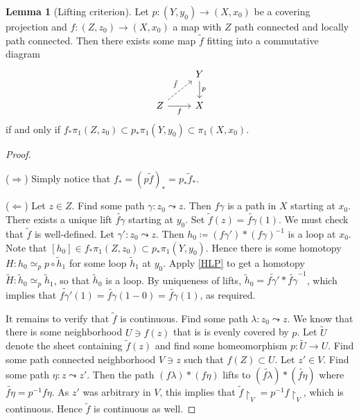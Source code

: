 \documentclass[10pt,letterpaper,cm]{nupset}
\theoremstyle{definition}
\theoremstyle{theorem}
\newtheorem{lemma}[definition]{Lemma}
\theoremstyle{remark}
\newcommand{\1}{\mathbb{1}}
\newcommand{\0}{\vec 0}
\begin{document}
\begin{lemma}[Lifting criterion]\label{LC}
Let $p: \left(Y, y_0\right) \to \left(X, x_0\right)$ be a covering projection and $f: (Z, z_0) \to \left(X, x_0\right)$ a map with $Z$ path connected and locally path connected.  Then there exists some map $\tilde{f}$ fitting into a commutative diagram \[
\begin{tikzcd}
 & Y \arrow[d, "p"] \\
Z \arrow[r, "f"'] \arrow[ru, "\tilde{f}", dashed] & X
\end{tikzcd}
\] if and only if  $f_{\ast}\pi_1(Z, z_0) \subset p_{\ast} \pi_1\left(Y, y_0\right) \subset \pi_1\left(X, x_0\right)$. 
\end{lemma}
\begin{proof} $ $

\smallskip

($\Longrightarrow$) Simply notice that $f_{\ast} = \left(p\tilde{f}\right)_{\ast}= p_{\ast}\tilde{f}_{\ast}$.

\medskip

 
($\Longleftarrow$) Let $z\in Z$. Find some path $\gamma : z_0 \leadsto z$.  Then $f \gamma$ is a path in $X$ starting at $x_0$. There exists a unique lift $\widetilde{f \gamma}$ starting at $y_0$. Set $\tilde{f}(z) = \widetilde{f \gamma}(1)$. We must check that $\tilde{f}$ is well-defined. Let $\gamma' : z_0 \leadsto z$. Then $h_0\coloneqq (f \gamma ')\ast (f\gamma)^{-1}$ is a loop at $x_0$. Note that $\left[h_0\right] \in f_{\ast}\pi_1(Z, z_0) \subset p_{\ast} \pi_1\left(Y, y_0\right)$. Hence there is some homotopy $H: h_0 \simeq_p p \circ \tilde{h}_1$ for some loop $\tilde{h}_1$ at $y_0$. Apply \cref{HLP} to get a homotopy $\widetilde{H} : \tilde{h}_0 \simeq_p \tilde{h}_1$, so that $\tilde{h}_0$ is a loop. By uniqueness of lifts, $\tilde{h}_0 =\widetilde{f \gamma '}\ast \widetilde{f\gamma}^{-1}$, which implies that $\widetilde{f \gamma '}(1) = \widetilde{f\gamma}(1-0) = \widetilde{f\gamma}(1)$, as required.

\medskip

 It remains to verify that $\tilde{f}$ is continuous. Find some path $\lambda : z_0 \leadsto z$. We know that there is some neighborhood $U \ni f(z)$ that is is evenly covered by $p$. Let $\widetilde{U}$ denote the sheet containing $\tilde{f}(z)$ and find some homeomorphism $p : \widetilde{U} \to U $. Find some path connected neighborhood $V\ni z$ such that $f(Z) \subset U$. Let $z' \in V$. Find some path $\eta : z \leadsto z'$. Then the path $\left(f \lambda \right)\ast \left(f \eta\right)$ lifts to $\left(\widetilde{f \lambda}\right) \ast \left(\widetilde{f \eta}\right)$ where $\widetilde{f\eta} = p^{-1}f\eta$. As $z'$ was arbitrary in $V$, this implies that $\tilde{f}\restriction_V =p^{-1}f\restriction_V$, which is continuous. Hence $\tilde{f}$ is continuous as well. 
\end{proof}
\end{document}
